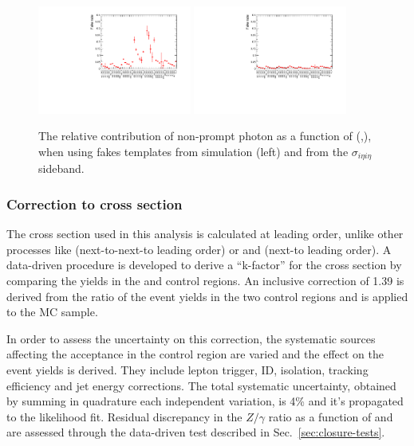 \begin{figure}[h!]
  \centering
  \includegraphics[width=0.45\textwidth]{figures/photonpurity/fake_rate_MC}
  \includegraphics[width=0.45\textwidth]{figures/photonpurity/fake_rate_see}
  \caption{\label{fig:photon-purities} 
  The relative contribution of non-prompt photon as a function
  of (\njet,\HT), when using fakes templates from simulation (left)
  and from the $\sigma_{i\eta i\eta}$ sideband.}
\end{figure}


\subsubsection{Correction to \texorpdfstring{\gj}{photon+jets} cross section}
\label{sec:gj-kfactor}

The \gj cross section used in this analysis is calculated at leading
order, unlike other processes like \ttj (next-to-next-to leading
order) or \zj and \wj (next-to leading order).  A data-driven
procedure is developed to derive a ``k-factor'' for the \gj cross
section by comparing the yields in the \gj and \mmj control regions.
An inclusive correction of 1.39 is derived from the ratio of the event
yields in the two control regions and is applied to the \gj MC sample.

In order to assess the uncertainty on this correction, the systematic
sources affecting the acceptance in the \mmj control region are varied
and the effect on the event yields is derived.  They include lepton
trigger, ID, isolation, tracking efficiency and jet energy
corrections.  The total systematic uncertainty, obtained by summing in
quadrature each independent variation, is 4\% and it's propagated to
the likelihood fit.  Residual discrepancy in the $Z/\gamma$ ratio as a
function of \scalht and \njet are assessed through the data-driven
test described in Sec.~\ref{sec:closure-tests}.

